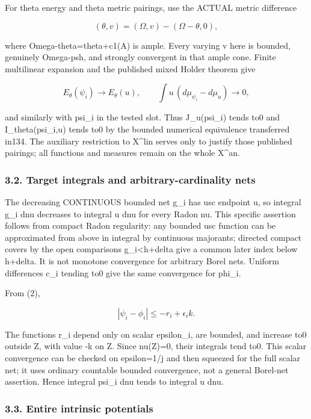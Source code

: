\documentclass[
  10pt,
]{article}
\begin{document}
For theta energy and theta metric pairings, use the ACTUAL metric
difference

\[(\theta,v)=(\Omega,v)-(\Omega-\theta,0),\]

where Omega-theta=theta+c1(A) is ample. Every varying v here is bounded,
genuinely Omega-psh, and strongly convergent in that ample cone. Finite
multilinear expansion and the published mixed Holder theorem give

\[E_\theta(\psi_i)\to E_\theta(u),\qquad
\int u\,(d\mu_{\psi_i}-d\mu_u)\to0,\]

and similarly with psi\_i in the tested slot. Thus J\_u(psi\_i) tends
to0 and I\_theta(psi\_i,u) tends to0 by the bounded numerical
equivalence transferred in134. The auxiliary restriction to X\^{}lin
serves only to justify those published pairings; all functions and
measures remain on the whole X\^{}an.

\subsubsection{3.2. Target integrals and arbitrary-cardinality
nets}\label{target-integrals-and-arbitrary-cardinality-nets}

The decreasing CONTINUOUS bounded net g\_i has usc endpoint u, so
integral g\_i dnu decreases to integral u dnu for every Radon nu. This
specific assertion follows from compact Radon regularity: any bounded
usc function can be approximated from above in integral by continuous
majorants; directed compact covers by the open comparisons
g\_i\textless h+delta give a common later index below h+delta. It is not
monotone convergence for arbitrary Borel nets. Uniform differences c\_i
tending to0 give the same convergence for phi\_i.

From (2),

\[|\psi_i-\phi_i|\leq-r_i+\epsilon_i k.\]

The functions r\_i depend only on scalar epsilon\_i, are bounded, and
increase to0 outside Z, with value -k on Z. Since nu(Z)=0, their
integrals tend to0. This scalar convergence can be checked on
epsilon=1/j and then squeezed for the full scalar net; it uses ordinary
countable bounded convergence, not a general Borel-net assertion. Hence
integral psi\_i dnu tends to integral u dnu.

\subsubsection{3.3. Entire intrinsic
potentials}\label{entire-intrinsic-potentials}
\end{document}
